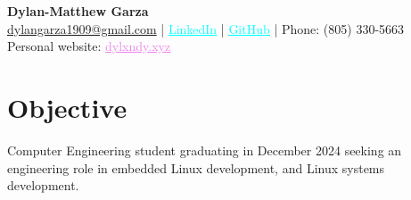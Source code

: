 \documentclass[letter,12pt]{article}
\begin{document}
\begin{center}
\textbf{\LARGE Dylan-Matthew Garza} \\[0.1cm]
\href{mailto:dylangarza1909@gmail.com}{dylangarza1909@gmail.com} |
  \href{https://www.linkedin.com/in/dylan-matthew-garza-094b021ba/}{\textcolor{cyan}{\underline{LinkedIn}}} |
  \href{https://github.com/DMGDy}{\textcolor{cyan}{\underline{GitHub}}} |
Phone: (805) 330-5663\\
  Personal website: \href{dylxndy.xyz}{\textcolor{violet}{\underline{dylxndy.xyz}}}
\end{center}

\vspace{-1.5cm}
\section*{Objective}
Computer Engineering student graduating in December 2024 seeking an 
engineering role in embedded Linux development, and Linux systems 
development.

\vspace{-.5cm}
\end{document}
